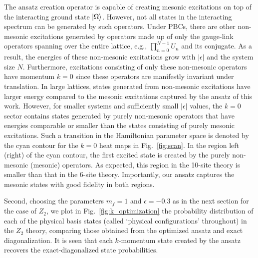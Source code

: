 \documentclass[a4paper,onecolumn,11pt,accepted=2024-10-11]{quantumarticle}
\begin{document}
The ansatz creation operator is capable of creating mesonic excitations on top of the interacting ground state $\ket{\Omega}$. However, not all states in the interacting spectrum can be generated by such operators. Under PBCs, there are other non-mesonic excitations generated by operators made up of only the gauge-link operators spanning over the entire lattice, e.g., $\prod_{n=0}^{N-1}U_n$ and its conjugate. As a result, the energies of these non-mesonic excitations grow with $|\epsilon|$ and the system size $N$. Furthermore, excitations consisting of only these non-mesonic operators have momentum $k=0$ since these operators are manifestly invariant under translation. In large lattices, states generated from non-mesonic excitations have larger energy compared to the mesonic excitations captured by the ansatz of this work. However, for smaller systems and sufficiently small $|\epsilon|$ values, the $k=0$ sector contains states generated by purely non-mesonic operators that have energies comparable or smaller than the states consisting of purely mesonic excitations.
Such a transition in the Hamiltonian parameter space is denoted by the cyan contour for the $k=0$ heat maps in Fig.~\ref{fig:scan}. In the region left (right) of the cyan contour, the first excited state is created by the purely non-mesonic (mesonic) operators. As expected, this region in the 10-site theory is smaller than that in the 6-site theory. Importantly, our ansatz captures the mesonic states with good fidelity in both regions.


Second, choosing the parameters $m_f=1$ and $\epsilon=-0.3$ as in the next section for the case of $Z_2$, we plot in Fig.~\ref{fig:k_optimization} the probability distribution of each of the physical basis states (called `physical configurations' throughout) in the $Z_2$ theory, comparing those obtained from the optimized ansatz and exact diagonalization. It is seen that each $k$-momentum state created by the ansatz recovers the exact-diagonalized state probabilities. 
\end{document}

